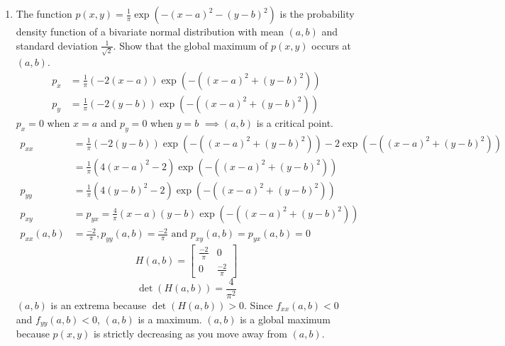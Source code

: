 \begin{enumerate}
	\item The function $p(x,y) = \frac{1}{\pi}\exp{\left(-(x-a)^2 - (y-b)^2\right)}$ is the probability density function of a bivariate normal distribution with mean $(a,b)$ and standard deviation $\frac{1}{\sqrt{2}}$. Show that the global maximum of $p(x,y)$ occurs at $(a,b)$.
	\begin{align*}
		p_x &= \frac{1}{\pi}(-2(x-a))\exp{(-((x-a)^2 + (y-b)^2))} \\
		p_y &= \frac{1}{\pi}(-2(y-b))\exp{(-((x-a)^2 + (y-b)^2))}
	\end{align*}
	$p_x = 0$ when $x=a$ and $p_y = 0$ when $y=b$
	$\implies (a,b)$ is a critical point.
	\begin{align*}
		p_{xx} &= \frac{1}{\pi}(-2(y-b))\exp{(-((x-a)^2 + (y-b)^2))} - 2\exp{(-((x-a)^2 + (y-b)^2))} \\
		&= \frac{1}{\pi}(4(x-a)^2 - 2)\exp{(-((x-a)^2 + (y-b)^2))} \\
		p_{yy} &= \frac{1}{\pi}(4(y-b)^2 - 2)\exp{(-((x-a)^2 + (y-b)^2))} \\
		p_{xy} &= p_{yx} = \frac{4}{\pi}(x-a)(y-b)\exp{(-((x-a)^2 + (y-b)^2))} \\
		p_{xx}(a,b) &= \frac{-2}{\pi}, p_{yy}(a,b) = \frac{-2}{\pi} \text{ and } p_{xy}(a,b) = p_{yx}(a,b) = 0
	\end{align*}
	\begin{equation*}
		H(a,b) = \begin{bmatrix}
		\frac{-2}{\pi} & 0 \\
		0 & \frac{-2}{\pi}
		\end{bmatrix}
	\end{equation*}
	\begin{equation*}
		\det{(H(a,b))} = \frac{4}{\pi^2}
	\end{equation*}
	$(a,b)$ is an extrema because $\det{(H(a,b))} > 0$.
	Since $f_{xx}(a,b) < 0$ and $f_{yy}(a,b) < 0$, $(a,b)$ is a maximum.
	$(a,b)$ is a global maximum because $p(x,y)$ is strictly decreasing as you move away from $(a,b)$.\\
	

\end{enumerate}
